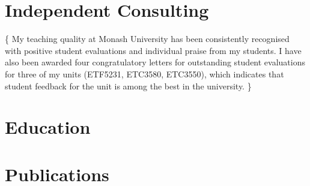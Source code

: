 \documentclass[11pt, a4paper]{awesome-cv}
\begin{document}
\hypertarget{independent-consulting}{%
\section{Independent Consulting}\label{independent-consulting}}

\footnotesize\{ My teaching quality at Monash University has been
consistently recognised with positive student evaluations and individual
praise from my students. I have also been awarded four congratulatory
letters for outstanding student evaluations for three of my units
(ETF5231, ETC3580, ETC3550), which indicates that student feedback for
the unit is among the best in the university. \}

\begin{cvhonors}
\end{cvhonors}

\hypertarget{education}{%
\section{Education}\label{education}}

\begin{cventries}
\end{cventries}

\hypertarget{publications}{%
\section{Publications}\label{publications}}
\end{document}
